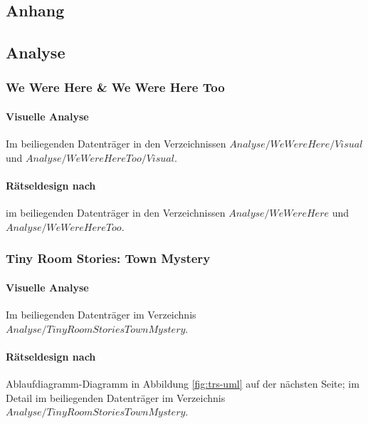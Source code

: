 \documentclass[
	12pt,
	a4paper,
	bibtotoc,
	cleardoubleempty, 
	idxtotoc,
	ngerman,
	openright
	final,
	listof=nochaptergap,
	]{scrbook}
\begin{document}
\begin{appendices}
\chapter{Anhang}

\section{Analyse}

\subsection{We Were Here \& We Were Here Too}\label{sec:append_anylsis_wwh_wwht}

\subsubsection{Visuelle Analyse}\label{sec:append_anylsis_wwh_wwht_visual}
Im beiliegenden Datenträger in den Verzeichnissen $Analyse/WeWereHere/Visual$ und $Analyse/WeWereHereToo/Visual$.

\subsubsection{Rätseldesign nach \cite{tim_schafer_grim_1996}}\label{sec:append_riddles_wwh_wwht}
im beiliegenden Datenträger in den Verzeichnissen $Analyse/WeWereHere$ und $Analyse/WeWereHereToo$.

\subsection{Tiny Room Stories: Town Mystery}\label{sec:append_anylsis_trstm}

\subsubsection{Visuelle Analyse}\label{sec:append_analysis_trstm}
Im beiliegenden Datenträger im Verzeichnis $Analyse/TinyRoomStoriesTownMystery$.

\subsubsection{Rätseldesign nach \cite{tim_schafer_grim_1996}}\label{sec:append_riddles_trstm}
Ablaufdiagramm-Diagramm in Abbildung \ref{fig:trs-uml} auf der nächsten Seite; im Detail im beiliegenden Datenträger im Verzeichnis $Analyse/TinyRoomStoriesTownMystery$.


\end{appendices}
\end{document}
